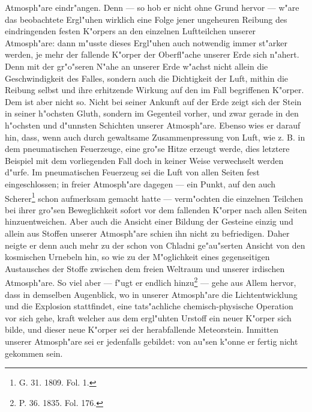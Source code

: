 \documentclass[a4paper, 8pt, oneside, polutonikogreek, german]{article}
\begin{document}
Atmosph"are eindr"angen. Denn --- so hob er nicht ohne Grund hervor --- w"are das beobachtete Ergl"uhen wirklich eine Folge jener ungeheuren Reibung des eindringenden festen K"orpers an den einzelnen Luftteilchen unserer Atmosph"are: dann m"usste dieses Ergl"uhen auch notwendig immer st"arker werden, je mehr der fallende K"orper der Oberfl"ache unserer Erde sich n"ahert. Denn mit der gr"o"seren N"ahe an unserer Erde w"achst nicht allein die Geschwindigkeit des Falles, sondern auch die Dichtigkeit der Luft, mithin die Reibung selbst und ihre erhitzende Wirkung auf den im Fall begriffenen K"orper. Dem ist aber nicht so. Nicht bei seiner Ankunft auf der Erde zeigt sich der Stein in seiner h"ochsten Gluth, sondern im Gegenteil vorher, und zwar gerade in den h"ochsten und d"unnsten Schichten unserer Atmosph"are. Ebenso wies er darauf hin, dass, wenn auch durch gewaltsame Zusammenpressung von Luft, wie z. B. in dem pneumatischen Feuerzeuge, eine gro"se Hitze erzeugt werde, dies letztere Beispiel mit dem vorliegenden Fall doch in keiner Weise verwechselt werden d"urfe. Im pneumatischen Feuerzeug sei die Luft von allen Seiten fest eingeschlossen; in freier Atmosph"are dagegen --- ein Punkt, auf den auch Scherer\footnote{G. 31. 1809. Fol. 1.} schon aufmerksam gemacht hatte --- verm"ochten die einzelnen Teilchen bei ihrer gro"sen Beweglichkeit sofort vor dem fallenden K"orper nach allen Seiten hinzuentweichen. Aber auch die Ansicht einer Bildung der Gesteine einzig und allein aus Stoffen unserer Atmosph"are schien ihn nicht zu befriedigen. Daher neigte er denn auch mehr zu der schon von Chladni ge"au"serten Ansicht von den kosmischen Urnebeln hin, so wie zu der M"oglichkeit eines gegenseitigen Austausches der Stoffe zwischen dem freien Weltraum und unserer irdischen Atmosph"are. So viel aber --- f"ugt er endlich hinzu\footnote{P. 36. 1835. Fol. 176.} --- gehe aus Allem hervor, dass in demselben Augenblick, wo in unserer Atmosph"are die Lichtentwicklung und die Explosion stattfindet, eine tats"achliche chemisch-physische Operation vor sich gehe, kraft welcher aus dem ergl"uhten Urstoff ein neuer K"orper sich bilde, und dieser neue K"orper sei der herabfallende Meteorstein. Inmitten unserer Atmosph"are sei er jedenfalls gebildet: von au"sen k"onne er fertig nicht gekommen sein.
\end{document}
